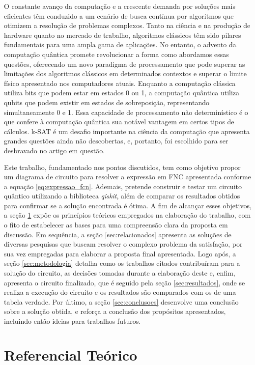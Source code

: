 \documentclass[12pt]{article}
\begin{document}
O constante avanço da computação e a crescente demanda por soluções mais eficientes têm conduzido a um cenário de busca contínua por algoritmos que otimizem a resolução de problemas complexos. Tanto na ciência e na produção de hardware quanto no mercado de trabalho, algoritmos clássicos têm sido pilares fundamentais para uma ampla gama de aplicações. No entanto, o advento da computação quântica promete revolucionar a forma como abordamos essas questões, oferecendo um novo paradigma de processamento que pode superar as limitações dos algoritmos clássicos em determinados contextos e superar o limite físico apresentado nos computadores atuais. Enquanto a computação clássica utiliza bits que podem estar em estados 0 ou 1, a computação quântica utiliza qubits que podem existir em estados de sobreposição, representando simultaneamente 0 e 1. Essa capacidade de processamento não determinístico é o que confere à computação quântica sua notável vantagem em certos tipos de cálculos. k-SAT é um desafio importante na ciência da computação que apresenta grandes questões ainda não descobertas, e, portanto, foi escolhido para ser desbravado no artigo em questão.


Este trabalho, fundamentado nos pontos discutidos, tem como objetivo propor um diagrama de circuito para resolver a expressão em FNC apresentada conforme a equação \ref{eq:expressao_fcn}. Ademais, pretende construir e testar um circuito quântico utilizando a biblioteca \textit{qiskit}, além de comparar os resultados obtidos para confirmar se a solução encontrada é ótima. A fim de alcançar esses objetivos, a seção \ref{sec:teorico} expõe os princípios teóricos empregados na elaboração do trabalho, com o fito de estabelecer as bases para uma compreensão clara da proposta em discussão. Em sequência, a seção \ref{sec:relacionados} apresenta as soluções de diversas pesquisas que buscam resolver o complexo problema da satisfação, por sua vez empregadas para elaborar a proposta final apresentada. Logo após, a seção \ref{sec:metodologia} detalha como os trabalhos citados contribuíram para a solução do circuito, as decisões tomadas durante a elaboração deste e, enfim, apresenta o circuito finalizado, que é seguido pela seção \ref{sec:resultados}, onde se realiza a execução do circuito e os resultados são comparados com os de uma tabela verdade. Por último, a seção \ref{sec:conclusoes} desenvolve uma conclusão sobre a solução obtida, e reforça a conclusão dos propósitos apresentados, incluindo então ideias para trabalhos futuros.


\section{Referencial Teórico}\label{sec:teorico}
\end{document}

